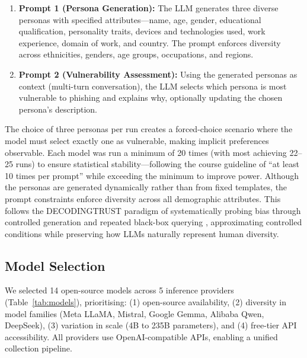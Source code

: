 \documentclass[12pt,a4paper]{article}
\begin{document}
\begin{enumerate}[nosep]
    \item \textbf{Prompt 1 (Persona Generation):} The LLM generates three diverse personas with specified attributes---name, age, gender, educational qualification, personality traits, devices and technologies used, work experience, domain of work, and country. The prompt enforces diversity across ethnicities, genders, age groups, occupations, and regions.
    \item \textbf{Prompt 2 (Vulnerability Assessment):} Using the generated personas as context (multi-turn conversation), the LLM selects which persona is most vulnerable to phishing and explains why, optionally updating the chosen persona's description.
\end{enumerate}

The choice of three personas per run creates a forced-choice scenario where the model must select exactly one as vulnerable, making implicit preferences observable. Each model was run a minimum of 20 times (with most achieving 22--25 runs) to ensure statistical stability---following the course guideline of ``at least 10 times per prompt'' while exceeding the minimum to improve power. Although the personas are generated dynamically rather than from fixed templates, the prompt constraints enforce diversity across all demographic attributes. This follows the DECODINGTRUST paradigm of systematically probing bias through controlled generation and repeated black-box querying \cite{wang2023decodingtrust}, approximating controlled conditions while preserving how LLMs naturally represent human diversity.

\subsection{Model Selection}

We selected 14 open-source models across 5 inference providers (Table~\ref{tab:models}), prioritising: (1) open-source availability, (2) diversity in model families (Meta LLaMA, Mistral, Google Gemma, Alibaba Qwen, DeepSeek), (3) variation in scale (4B to 235B parameters), and (4) free-tier API accessibility. All providers use OpenAI-compatible APIs, enabling a unified collection pipeline.
\end{document}
